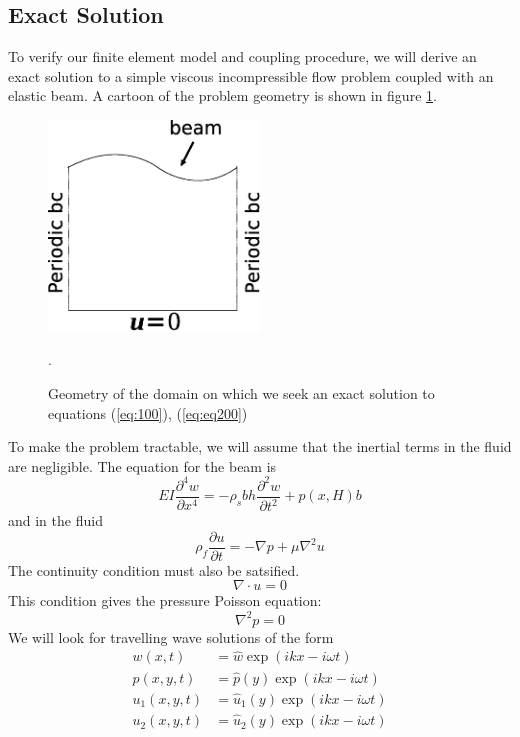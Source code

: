 \documentclass{article}
\begin{document}
\subsection{Exact Solution}
To verify our finite element model and coupling procedure, we will derive an exact solution to a simple viscous incompressible flow problem coupled with an elastic beam.
A cartoon of the problem geometry is shown in figure \ref{fig:ExactSolutionGeometry}.
\begin{figure}[ht]
        \centering
        \includegraphics[width=0.5\textwidth]{exact_cartoon} 
        \caption{Geometry of the domain on which we seek an exact solution to equations (\ref{eq:100}), (\ref{eq:eq200})}
        \label{fig:ExactSolutionGeometry}.
\end{figure}
To make the problem tractable, we will assume that the inertial terms in the fluid are negligible.
The equation for the beam is 
\begin{equation} EI \frac{\partial ^4 w}{\partial x^4} = -\rho_s b h \frac{\partial ^2 w}{\partial t^2}+p(x,H)b \label{eq:100} \end{equation}
and in the fluid
\begin{equation}  \rho_f \frac{\partial u}{\partial t} = -\nabla p + \mu \nabla^2 u \label{eq:eq200} \end{equation}
The continuity condition must also be satsified.  
\[ \nabla \cdot u = 0 \]
This condition gives the pressure Poisson equation:
\begin{equation} \nabla^2 p = 0 \label{eq:eq300} \end{equation}
We will look for travelling wave solutions of the form
\begin{equation}
\begin{aligned}
w(x,t)&=\hat{w}\exp(ikx-i\omega t) \\
p(x,y,t) &= \hat{p}(y)\exp(ikx-i\omega t) \\
u_1(x,y,t) &= \hat{u}_1(y)\exp(ikx-i\omega t)\\
u_2(x,y,t) &= \hat{u}_2(y)\exp(ikx-i\omega t)
\end{aligned}
\label{eq:eq400}
\end{equation}
\end{document}
